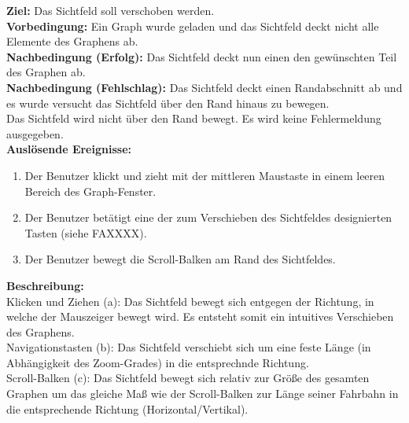 \label{fa:verschieben}
\textbf{Ziel:} Das Sichtfeld soll verschoben werden.\\
\textbf{Vorbedingung:} Ein Graph wurde geladen und das Sichtfeld deckt nicht alle Elemente des Graphens ab.\\
\textbf{Nachbedingung (Erfolg):}  Das Sichtfeld deckt nun einen den gewünschten Teil des Graphen ab.\\
\textbf{Nachbedingung (Fehlschlag):} Das Sichtfeld deckt einen Randabschnitt ab und es wurde versucht das Sichtfeld über den Rand hinaus zu bewegen.\\
Das Sichtfeld wird nicht über den Rand bewegt. Es wird keine Fehlermeldung ausgegeben.\\
\textbf{Auslösende Ereignisse:}
\begin{enumerate}[nolistsep, label=(\alph*)]
  \item Der Benutzer klickt und zieht mit der mittleren Maustaste in einem leeren Bereich des Graph-Fenster.
  \item Der Benutzer betätigt eine der zum Verschieben des Sichtfeldes designierten Tasten (siehe FAXXXX). %
  \item Der Benutzer bewegt die Scroll-Balken am Rand des Sichtfeldes. %
\end{enumerate}
\textbf{Beschreibung:}\\
Klicken und Ziehen (a): Das Sichtfeld bewegt sich entgegen der Richtung, in welche der Mauszeiger bewegt wird. Es entsteht somit ein intuitives Verschieben des Graphens.\\
Navigationstasten (b): Das Sichtfeld verschiebt sich um eine feste Länge (in Abhängigkeit des Zoom-Grades) in die entsprechnde Richtung.\\
Scroll-Balken (c): Das Sichtfeld bewegt sich relativ zur Größe des gesamten Graphen um das gleiche Maß wie der Scroll-Balken zur Länge seiner Fahrbahn in die entsprechende Richtung (Horizontal/Vertikal).\\

